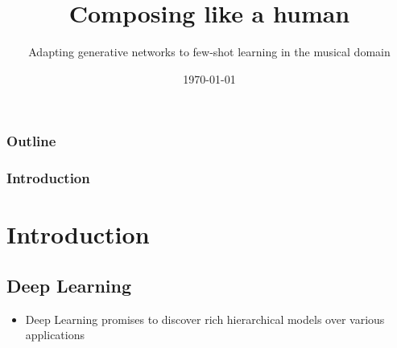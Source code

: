 \documentclass{beamer}
\title[Composing like a human]{Composing like a human}
\subtitle{Adapting generative networks to few-shot learning in the musical domain}
\author{Tudor Paisa  \texorpdfstring{\\ (SNR: 2019551, ANR: 315146)} \and \texttt{t.paisa@tilburguniversity.edu} }
\institute{Tilburg University}
\date{\today}
\begin{document}
\begin{frame}
    \titlepage
\end{frame}

\begin{frame}
    \frametitle{Outline}
    \tableofcontents
\end{frame}

\begin{frame}
    \frametitle{Introduction}
    \section{Introduction}
    \subsection{Deep Learning}
    \begin{itemize}
        \item Deep Learning promises to discover rich hierarchical models over various applications
    \end{itemize}

\end{frame}
\end{document}
